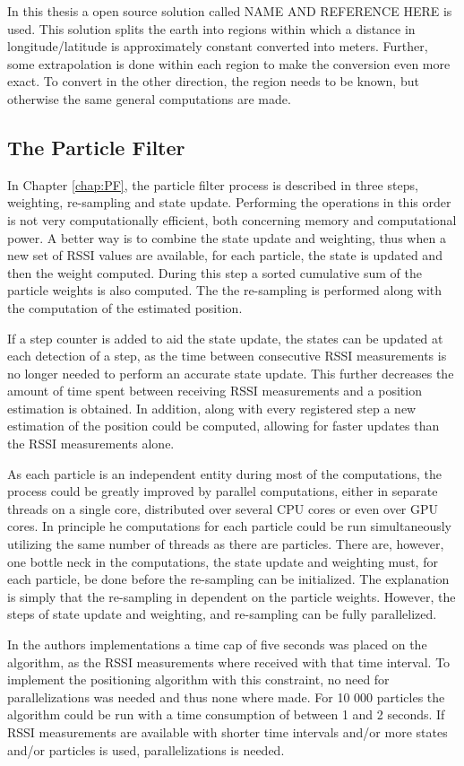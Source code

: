 \documentclass{LTHthesis}
\begin{document}
In this thesis a open source solution called NAME AND REFERENCE HERE is used. This solution splits the earth into regions within which a distance in longitude/latitude is approximately constant converted into meters. Further, some extrapolation is done within each region to make the conversion even more exact. To convert in the other direction, the region needs to be known, but otherwise the same general computations are made.   
%
\subsection{The Particle Filter}
%
In Chapter \ref{chap:PF}, the particle filter process is described in three steps, weighting, re-sampling and state update. Performing the operations in this order is not very computationally efficient, both concerning memory and computational power. A better way is to combine the state update and weighting, thus when a new set of RSSI values are available, for each particle, the state is updated and then the weight computed. During this step a sorted cumulative sum of the particle weights is also computed. The the re-sampling is performed along with the computation of the estimated position.

If a step counter is added to aid the state update, the states can be updated at each detection of a step, as the time between consecutive RSSI measurements is no longer needed to perform an accurate state update. This further decreases the amount of time spent between receiving RSSI measurements and a position estimation is obtained. In addition, along with every registered step a new estimation of the position could be computed, allowing for faster updates than the RSSI measurements alone. 

As each particle is an independent entity during most of the computations, the process could be greatly improved by parallel computations, either in separate threads on a single core, distributed over several CPU cores or even over GPU cores. In principle he computations for each particle could be run simultaneously utilizing the same number of threads as there are particles. There are, however, one bottle neck in the computations, the state update and weighting must, for each particle, be done before the re-sampling can be initialized. The explanation is simply that the re-sampling in dependent on the particle weights. However, the steps of state update and weighting, and re-sampling can be fully parallelized. 

In the authors implementations a time cap of five seconds was placed on the algorithm, as the RSSI measurements where received with that time interval. To implement the positioning algorithm with this constraint, no need for parallelizations was needed and thus none where made. For 10 000 particles the algorithm could be run with a time consumption of  between 1 and 2 seconds. If RSSI measurements are available with shorter time intervals and/or more states and/or particles is used, parallelizations is needed.     
%
\end{document}
